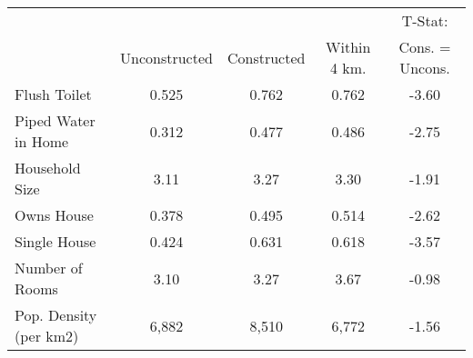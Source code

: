\begin{tabular}{l*{1}{cccc}}
 & & & &T-Stat:  \\
 &Unconstructed &Constructed &Within 4 km. &Cons. = Uncons.  \\
\hline 
Flush Toilet &      0.525 &      0.762 &      0.762 &      -3.60  \\
Piped Water in Home &      0.312 &      0.477 &      0.486 &      -2.75  \\
Household Size &       3.11 &       3.27 &       3.30 &      -1.91  \\
Owns House &      0.378 &      0.495 &      0.514 &      -2.62  \\
Single House &      0.424 &      0.631 &      0.618 &      -3.57  \\
Number of Rooms &       3.10 &       3.27 &       3.67 &      -0.98  \\
Pop. Density (per km2) &      6,882 &      8,510 &      6,772 &      -1.56  \\
\hline
\end{tabular}